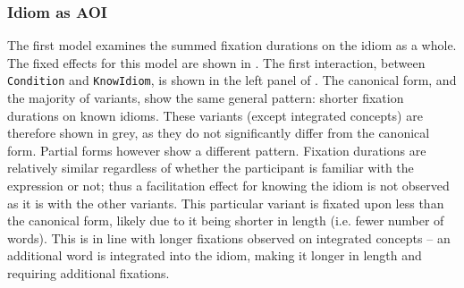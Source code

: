\documentclass[output=paper,modfonts,nonflat]{langsci/langscibook}
\begin{document}
\subsubsection{Idiom as AOI}

The first model examines the summed fixation durations on the idiom as a whole. The fixed effects for this model are shown in . The first interaction, between \texttt{Condition} and \texttt{KnowIdiom}, is shown in the left panel of . The canonical form, and the majority of variants, show the same general pattern: shorter fixation durations on known idioms. These variants (except integrated concepts) are therefore shown in grey, as they do not significantly differ from the canonical form. Partial forms however show a different pattern. Fixation durations are relatively similar regardless of whether the participant is familiar with the expression or not; thus a facilitation effect for knowing the idiom is not observed as it is with the other variants. This particular variant is fixated upon less than the canonical form, likely due to it being shorter in length (i.e. fewer number of words). This is in line with longer fixations observed on integrated concepts -- an additional word is integrated into the idiom, making it longer in length and requiring additional fixations.
\end{document}
